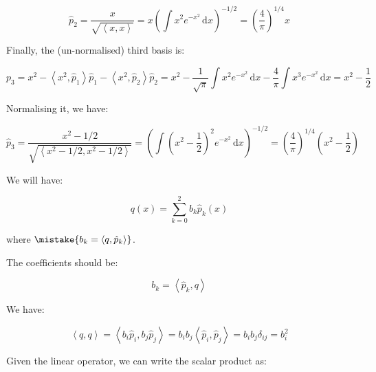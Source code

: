 \documentclass[12pt]{article}
\begin{document}
\begin{equation}
    \hat{p}_{2} = \frac{x}{\sqrt{\left\langle x, x \right\rangle}} = x \left( \int x^{2} e^{-x^{2}} \, \mathrm{d}x \right)^{-1/2} = \left( \frac{4}{\pi} \right)^{1/4} x
\end{equation}

Finally, the (un-normalised) third basis is:

\begin{equation}
    p_{3} = x^{2} - \left\langle x^{2}, \hat{p}_{1} \right\rangle \hat{p}_{1} - \left\langle x^{2}, \hat{p}_{2} \right\rangle \hat{p}_{2} = x^{2} - \frac{1}{\sqrt{\pi}} \int x^{2} e^{-x^{2}} \, \mathrm{d}x - \frac{4}{\pi} \int x^{3} e^{-x^{2}} \, \mathrm{d}x = x^{2} - \frac{1}{2}
\end{equation}

Normalising it, we have:

\begin{equation}
    \hat{p}_{3} = \frac{x^{2} - 1/2}{\sqrt{\left\langle x^{2} - 1/2, x^{2} - 1/2 \right\rangle}} = \left( \int \left( x^{2} - \frac{1}{2} \right)^{2} e^{-x^{2}} \, \mathrm{d}x \right)^{-1/2} = \left( \frac{4}{\pi} \right)^{1/4} \left( x^{2} - \frac{1}{2} \right)
\end{equation}

We will have:

\begin{equation}
    q(x) = \sum_{k=0}^{2} b_{k} \hat{p}_{k}(x)
\end{equation}

where $\mistake{b_{k} = \left\langle q, \hat{p}_{k} \right\rangle}$.

\begin{correction}
    The coefficients should be:

    \begin{equation}
        b_{k} = \left\langle \hat{p}_{k}, q \right\rangle
    \end{equation}
\end{correction}

We have:

\begin{equation}
    \left\langle q, q \right\rangle =  \left\langle b_{i} \hat{p}_{i}, b_{j} \hat{p}_{j} \right\rangle = b_{i} b_{j} \left\langle \hat{p}_{i}, \hat{p}_{j} \right\rangle = b_{i} b_{j} \delta_{ij} = b_{i}^{2}
\end{equation}

Given the linear operator, we can write the scalar product as:
\end{document}
